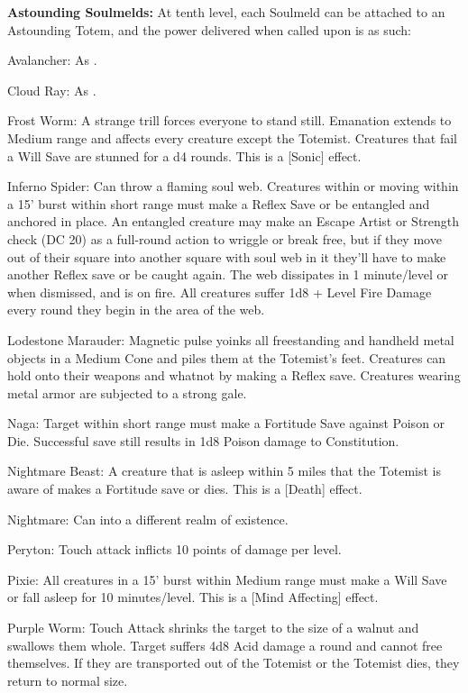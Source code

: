 \textbf{Astounding Soulmelds:} At tenth level, each Soulmeld can be attached to an Astounding Totem, and the power delivered when called upon is as such:
\begin{description*}
\item[Avalancher:] As .
\item[Cloud Ray:] As .
\item[Frost Worm:] A strange trill forces everyone to stand still. Emanation extends to Medium range and affects every creature except the Totemist. Creatures that fail a Will Save are stunned for a d4 rounds. This is a [Sonic] effect.
\item[Inferno Spider:] Can throw a flaming soul web. Creatures within or moving within a 15' burst within short range must make a Reflex Save or be entangled and anchored in place. An entangled creature may make an Escape Artist or Strength check (DC 20) as a full-round action to wriggle or break free, but if they move out of their square into another square with soul web in it they'll have to make another Reflex save or be caught again. The web dissipates in 1 minute/level or when dismissed, and is on fire. All creatures suffer 1d8 + Level Fire Damage every round they begin in the area of the web.
\item[Lodestone Marauder:] Magnetic pulse yoinks all freestanding and handheld metal objects in a Medium Cone and piles them at the Totemist's feet. Creatures can hold onto their weapons and whatnot by making a Reflex save. Creatures wearing metal armor are subjected to a strong gale.
\item[Naga:] Target within short range must make a Fortitude Save against Poison or Die. Successful save still results in 1d8 Poison damage to Constitution.
\item[Nightmare Beast:] A creature that is asleep within 5 miles that the Totemist is aware of makes a Fortitude save or dies. This is a [Death] effect.
\item[Nightmare:] Can  into a different realm of existence.
\item[Peryton:] Touch attack inflicts 10 points of damage per level.
\item[Pixie:] All creatures in a 15' burst within Medium range must make a Will Save or fall asleep for 10 minutes/level. This is a [Mind Affecting] effect.
\item[Purple Worm:] Touch Attack shrinks the target to the size of a walnut and swallows them whole. Target suffers 4d8 Acid damage a round and cannot free themselves. If they are transported out of the Totemist or the Totemist dies, they return to normal size.

\end{description*}
